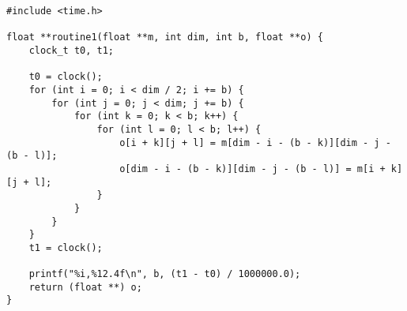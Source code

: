 \begin{code}
    \begin{verbatim}
#include <time.h>

float **routine1(float **m, int dim, int b, float **o) {
    clock_t t0, t1;

    t0 = clock();
    for (int i = 0; i < dim / 2; i += b) {
        for (int j = 0; j < dim; j += b) {
            for (int k = 0; k < b; k++) {
                for (int l = 0; l < b; l++) {
                    o[i + k][j + l] = m[dim - i - (b - k)][dim - j - (b - l)];
                    o[dim - i - (b - k)][dim - j - (b - l)] = m[i + k][j + l];
                }
            }
        }
    }
    t1 = clock();

    printf("%i,%12.4f\n", b, (t1 - t0) / 1000000.0);
    return (float **) o;
}
    \end{verbatim}
\end{code}
